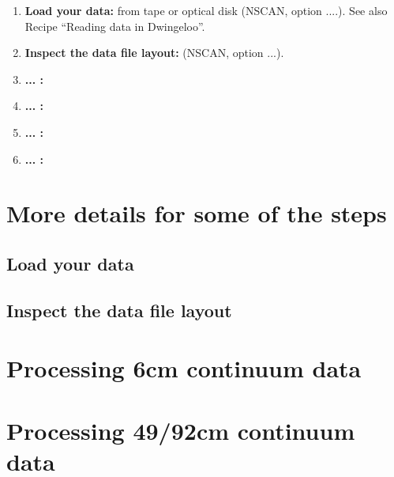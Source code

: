 \begin{enumerate} 
\item {\bf Load your data:} from tape or optical disk (NSCAN, option ....). See
also Recipe ``Reading data in Dwingeloo''. 
\item {\bf Inspect the data file layout:} (NSCAN, option ...). 
\item {\bf ... :} 
\item {\bf ... :} 
\item {\bf ... :} 
\item {\bf ... :} 
\end{enumerate} 


\section{More details for some of the steps} 
\label{.detail} 

\subsection{Load your data} 
\label{.detail.load} 

\subsection{Inspect the data file layout} 
\label{.detail.layout} 


\section{Processing 6cm continuum data} 
\label{.6cm} 


\section{Processing 49/92cm continuum data} 
\label{.49/92cm} 
